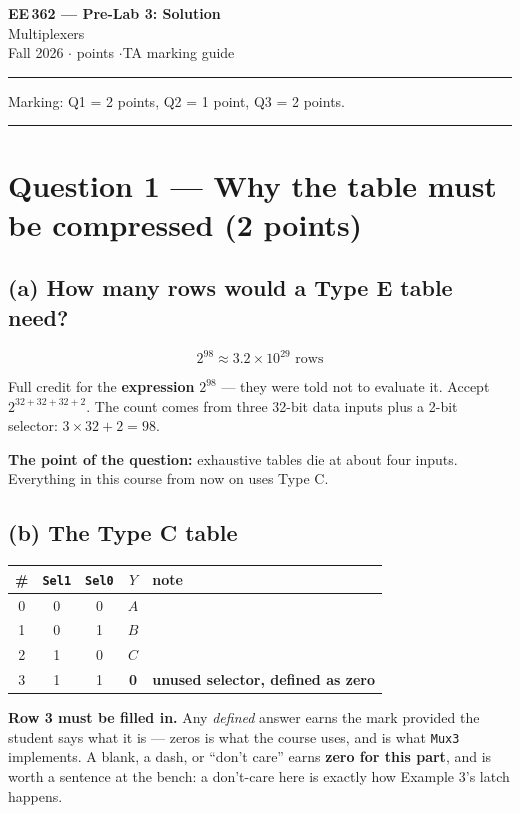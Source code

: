 \documentclass[11pt]{article}
\newcommand{\code}[1]{\texttt{#1}}
\newcommand{\hr}{\vspace{2pt}\hrule\vspace{6pt}}
\begin{document}
\begin{center}
{\Large\bfseries EE\,362 --- Pre-Lab 3: Solution}\\[2pt]
{\large Multiplexers}\\[4pt]
Fall 2026 \quad$\cdot$ points \quad$\cdot$\quad TA marking guide
\end{center}
\hr

{\small Marking: Q1 = 2 points, Q2 = 1 point, Q3 = 2 points.}

\vspace{4pt}\hr

\section*{Question 1 --- Why the table must be compressed (2 points)}

\subsection*{(a) How many rows would a Type E table need?}

\[
2^{98} \approx 3.2 \times 10^{29} \text{ rows}
\]

Full credit for the \textbf{expression} $2^{98}$ --- they were told not to
evaluate it. Accept $2^{32+32+32+2}$. The count comes from three 32-bit data
inputs plus a 2-bit selector: $3 \times 32 + 2 = 98$.

\textbf{The point of the question:} exhaustive tables die at about four inputs.
Everything in this course from now on uses Type C.

\subsection*{(b) The Type C table}

\begin{center}
\begin{tabular}{c|cc|c|l}
\toprule
\# & \code{Sel1} & \code{Sel0} & $Y$ & note \\
\midrule
0 & 0 & 0 & $A$ & \\
1 & 0 & 1 & $B$ & \\
2 & 1 & 0 & $C$ & \\
3 & 1 & 1 & \textbf{0} & \textbf{unused selector, defined as zero} \\
\bottomrule
\end{tabular}
\end{center}

\textbf{Row 3 must be filled in.} Any \emph{defined} answer earns the mark
provided the student says what it is --- zeros is what the course uses, and is
what \code{Mux3} implements. A blank, a dash, or ``don't care'' earns
\textbf{zero for this part}, and is worth a sentence at the bench: a don't-care
here is exactly how Example 3's latch happens.
\end{document}
